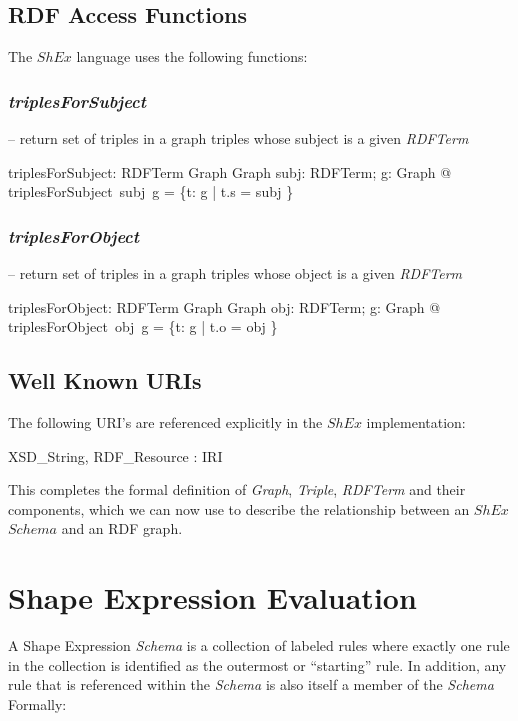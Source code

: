 \documentclass[fuzz]{llncs}
\def\zc{\textit}
\begin{document}
\subsection{RDF Access Functions}

The $ShEx$ language uses the following functions:

\subsubsection{\zc{triplesForSubject}} -- return set of triples in a graph triples whose subject is a given \zc{RDFTerm}
\begin{gendef}
   triplesForSubject: RDFTerm \fun Graph \fun Graph
\where
   \forall subj: RDFTerm; g: Graph @ triplesForSubject~subj~g = \{t: g | t.s = subj \}
\end{gendef}

\subsubsection{\zc{triplesForObject}} -- return set of triples in a graph triples whose object is a given \zc{RDFTerm}
\begin{gendef}
   triplesForObject: RDFTerm \fun Graph \fun Graph
\where
   \forall obj: RDFTerm; g: Graph @ triplesForObject~obj~g = \{t: g | t.o = obj \}
\end{gendef}

\subsection{Well Known URIs}

The following URI's are referenced explicitly in the $ShEx$ implementation:

\begin{axdef}
XSD\_String, RDF\_Resource : IRI
\end{axdef}

This completes the formal definition of \zc{Graph}, \zc{Triple}, \zc{RDFTerm} and their components, which we can now use to describe the relationship between an $ShEx$ $Schema$ and an RDF graph.

\section{Shape Expression Evaluation}
A Shape Expression \zc{Schema} is a collection of labeled rules where exactly one rule in the collection is identified as the outermost or ``starting'' rule. In addition, any rule 
that is referenced within the \zc{Schema} is also itself a member of the \zc{Schema} Formally:
\end{document}
